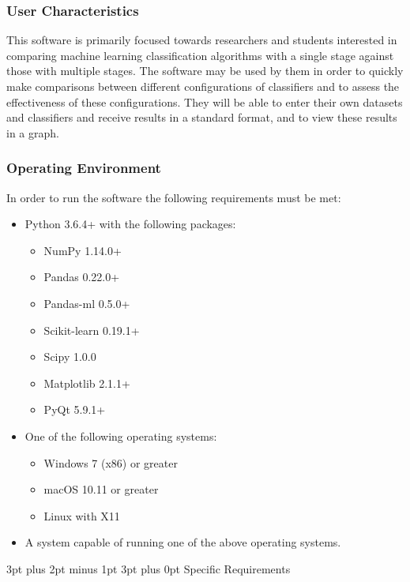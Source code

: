 \documentclass[12pt,a4paper]{article}
\makeatletter
\renewcommand\subsection{\@startsection {subsection}{1}{2mm} %
      {3pt plus 2pt minus 1pt} %
      {3pt plus 0pt} %
      {\normalfont\bfseries}}
\makeatother
\begin{document}
\subsubsection{User Characteristics}
This software is primarily focused towards researchers and students interested in comparing machine learning classification algorithms with a single stage against those with multiple stages. The software may be used by them in order to quickly make comparisons between different configurations of classifiers and to assess the effectiveness of these configurations. They will be able to enter their own datasets and classifiers and receive results in a standard format, and to view these results in a graph.
\subsubsection{Operating Environment}
In order to run the software the following requirements must be met:
\begin{itemize}
	\item{Python 3.6.4+ with the following packages:}
	\begin{itemize}
		\item{NumPy 1.14.0+}
		\item{Pandas 0.22.0+}
		\item{Pandas-ml 0.5.0+}
		\item{Scikit-learn 0.19.1+}
		\item{Scipy 1.0.0}
		\item{Matplotlib 2.1.1+}
		\item{PyQt 5.9.1+}
	\end{itemize}
\item{One of the following operating systems:}
	\begin{itemize}
		\item{Windows 7 (x86) or greater}
		\item{macOS 10.11 or greater}
		\item{Linux with X11}
	\end{itemize}
	\item{A system capable of running one of the above operating systems.}
\end{itemize}

\subsection{Specific Requirements}
\end{document}
